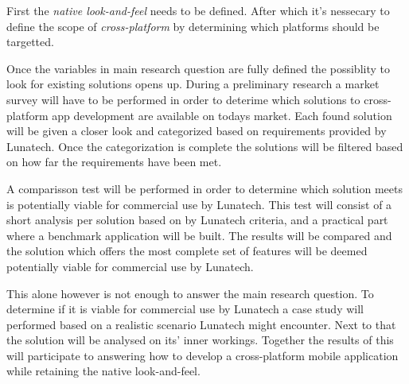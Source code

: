
First the \emph{native look-and-feel} needs to be defined. After which it's nessecary to define the scope of \emph{cross-platform} by determining which platforms should be targetted. 

Once the variables in main research question are fully defined the possiblity to look for existing solutions opens up. During a preliminary research a market survey will have to be performed in order to deterime which solutions to cross-platform app development are available on todays market. Each found solution will be given a closer look and categorized based on requirements provided by Lunatech. Once the categorization is complete the solutions will be filtered based on how far the requirements have been met.

A comparisson test will be performed in order to determine which solution meets is potentially viable for commercial use by Lunatech. This test will consist of a short analysis per solution based on by Lunatech criteria, and a practical part where a benchmark application will be built. The results will be compared and the solution which offers the most complete set of features will be deemed potentially viable for commercial use by Lunatech.

This alone however is not enough to answer the main research question. To determine if it is viable for commercial use by Lunatech a case study will performed based on a realistic scenario Lunatech might encounter. Next to that the solution will be analysed on its' inner workings. Together the results of this will participate to answering how to develop a cross-platform mobile application while retaining the native look-and-feel.

